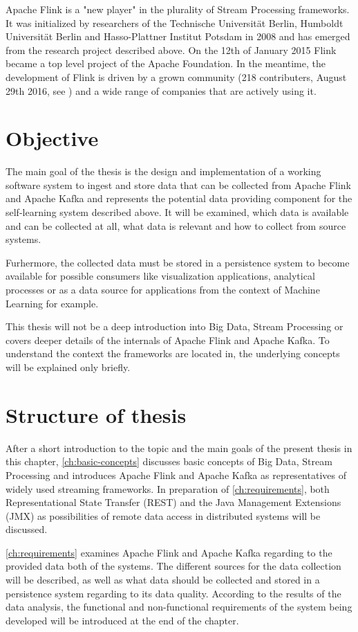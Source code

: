 Apache Flink is a "new player" in the plurality of Stream Processing frameworks. It
was initialized by researchers of the Technische Universität Berlin, Humboldt Universität
Berlin and Hasso-Plattner Institut Potsdam in 2008 and has emerged from the research
project described above.  On the 12th of January 2015 Flink became a top level project
of the Apache Foundation. In the meantime, the development of Flink is driven by a
grown community (218 contributers, August 29th 2016, see \cite{FlinkG16}) and a wide range of
companies that are actively using it.

\section{Objective}
The main goal of the thesis is the design and implementation of a working software system
to ingest and store data that can be collected from Apache Flink and Apache Kafka and
represents the potential data providing component for the self-learning system described
above. It will be examined, which data is available and can be collected at all, what data
is relevant and how to collect from source systems.

Furhermore, the collected data must be stored in a persistence system to become available
for possible consumers like visualization applications, analytical processes or as a data
source for applications from the context of Machine Learning for example.

This thesis will not be a deep introduction into Big Data, Stream Processing or covers deeper
details of the internals of Apache Flink and Apache Kafka. To understand the context the
frameworks are located in, the underlying concepts will be explained only briefly.

\section{Structure of thesis}
After a short introduction to the topic and the main goals of the present thesis in this
chapter, \autoref{ch:basic-concepts} discusses basic concepts of Big Data, Stream Processing and introduces
Apache Flink and Apache Kafka as representatives of widely used streaming frameworks. In preparation of \autoref{ch:requirements},
both Representational State Transfer (REST) and the Java Management Extensions (JMX) as possibilities of remote data access in
distributed systems will be discussed.

\autoref{ch:requirements} examines Apache Flink and Apache Kafka regarding to the provided data
both of the systems. The different sources for the data collection will be described, as
well as what data should be collected and stored in a persistence system regarding to its data quality.
According to the results of the data analysis, the functional
and non-functional requirements of the system being developed will be introduced at the
end of the chapter.

